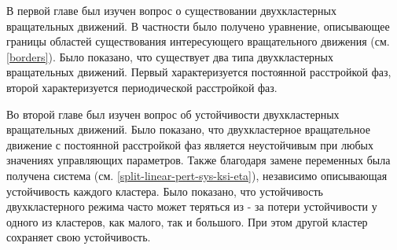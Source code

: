 В первой главе был изучен вопрос о существовании двухкластерных
вращательных движений. В частности было получено уравнение,
описывающее границы областей существования интересующего вращательного 
движения (см. \ref{borders}). Было показано, что существует два типа
двухкластерных вращательных движений. Первый характеризуется постоянной
расстройкой фаз, второй характеризуется периодической расстройкой фаз.


Во второй главе был изучен вопрос об устойчивости двухкластерных
вращательных движений. Было показано, что двухкластерное вращательное
движение с постоянной расстройкой фаз является неустойчивым при любых значениях
управляющих параметров. Также благодаря замене переменных была получена система (см. \ref{split-linear-pert-sys-ksi-eta}),
независимо описывающая устойчивость каждого кластера. Было показано, что устойчивость
двухкластерного режима часто может теряться из - за потери устойчивости
у одного из кластеров, как малого, так и большого. При этом другой кластер
сохраняет свою устойчивость.

